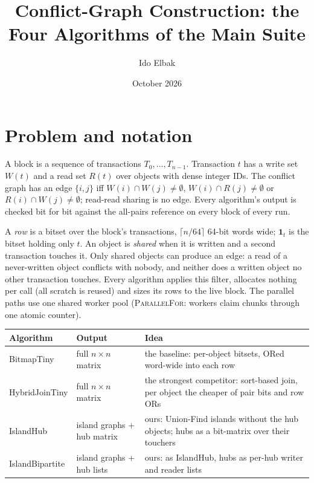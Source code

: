 \documentclass[10pt,a4paper]{article}
\title{Conflict-Graph Construction: the Four Algorithms of the Main Suite}
\author{Ido Elbak}
\date{October 2026}
\newcommand{\W}{\mathit{W}}
\newcommand{\R}{\mathit{R}}
\newcommand{\words}{\lceil n/64 \rceil}
\newcommand{\bit}[1]{\mathbf{1}_{#1}}
\begin{document}
\maketitle

\section*{Problem and notation}

A block is a sequence of transactions $T_0,\dots,T_{n-1}$. Transaction $t$ has a write set
$\W(t)$ and a read set $\R(t)$ over objects with dense integer IDs. The conflict graph has an
edge $\{i,j\}$ iff $\W(i)\cap\W(j)\neq\emptyset$, $\W(i)\cap\R(j)\neq\emptyset$ or
$\R(i)\cap\W(j)\neq\emptyset$; read-read sharing is no edge. Every algorithm's output is checked
bit for bit against the all-pairs reference on every block of every run.

A \emph{row} is a bitset over the block's transactions, $\words$ 64-bit words wide; $\bit{t}$ is the
bitset holding only $t$. An object is \emph{shared} when it is written and a second transaction
touches it. Only shared objects can produce an edge: a read of a never-written object conflicts
with nobody, and neither does a written object no other transaction touches. Every algorithm
applies this filter, allocates nothing per call (all scratch is reused) and sizes its rows to the
live block. The parallel paths use one shared worker pool (\textsc{ParallelFor}: workers claim
chunks through one atomic counter).

\begin{center}
\begin{tabularx}{\textwidth}{@{}l l X@{}}
\toprule
Algorithm & Output & Idea \\
\midrule
BitmapTiny     & full $n\times n$ matrix & the baseline: per-object bitsets, ORed word-wide into each row \\
HybridJoinTiny & full $n\times n$ matrix & the strongest competitor: sort-based join, per object the cheaper of pair bits and row ORs \\
IslandHub      & island graphs + hub matrix & ours: Union-Find islands without the hub objects; hubs as a bit-matrix over their touchers \\
IslandBipartite & island graphs + hub lists & ours: as IslandHub, hubs as per-hub writer and reader lists \\
\bottomrule
\end{tabularx}
\end{center}
\end{document}
